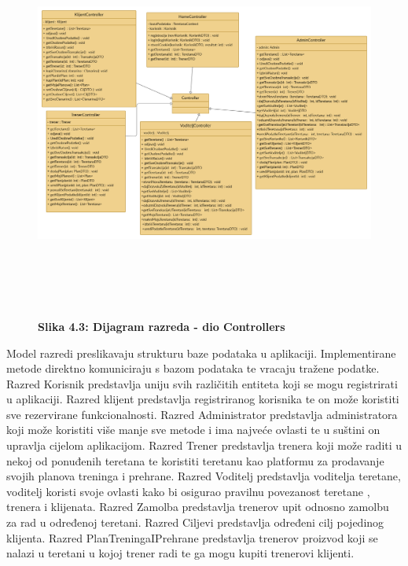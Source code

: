 		\begin{figure}[!htb]
			\includegraphics[height= 13cm,width=1.2\textwidth]{dokumentacija/slike/Controllers.jpg}
			\textbf{Slika 4.3: Dijagram razreda - dio Controllers}
		\end{figure}
		Model razredi preslikavaju strukturu baze podataka u aplikaciji. Implementirane metode direktno komuniciraju s bazom podataka te vracaju tražene podatke. Razred Korisnik predstavlja uniju svih različitih entiteta koji se mogu registrirati u aplikaciji. Razred klijent predstavlja registriranog korisnika te on može koristiti sve rezervirane funkcionalnosti. Razred Administrator predstavlja administratora koji može koristiti više manje sve metode i ima najveće ovlasti te u suštini on upravlja cijelom aplikacijom. Razred Trener predstavlja trenera koji može raditi u nekoj od ponuđenih teretana te koristiti teretanu kao platformu za prodavanje svojih planova treninga i prehrane. Razred Voditelj predstavlja voditelja teretane, voditelj koristi svoje ovlasti kako bi osigurao pravilnu povezanost teretane , trenera i klijenata. Razred Zamolba predstavlja trenerov upit odnosno zamolbu za rad u određenoj teretani. Razred Ciljevi predstavlja određeni cilj pojedinog klijenta. Razred PlanTreningaIPrehrane predstavlja trenerov proizvod koji se nalazi u teretani u kojoj trener radi te ga mogu kupiti trenerovi klijenti.
